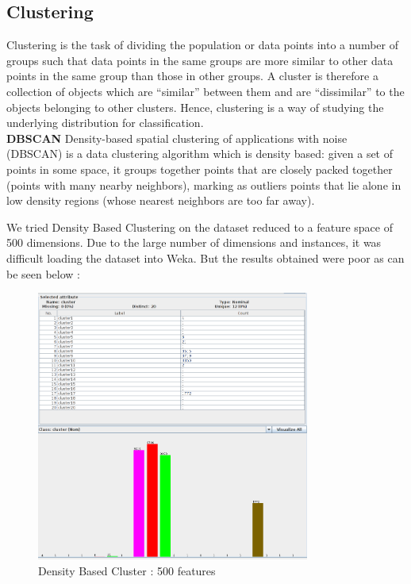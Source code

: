 \documentclass[12pt]{report}
\begin{document}
\subsection{Clustering}
Clustering is the task of dividing the population or data points into a number of groups such that data points in the same groups are more similar to other data points in the same group than those in other groups. A cluster is therefore a collection of objects which are “similar” between them and are “dissimilar” to the objects belonging to other clusters. Hence, clustering is a way of studying the underlying distribution for classification.\\

\textbf{DBSCAN}
Density-based spatial clustering of applications with noise (DBSCAN) is a data clustering algorithm which is density based: given a set of points in some space, it groups together points that are closely packed together (points with many nearby neighbors), marking as outliers points that lie alone in low density regions (whose nearest neighbors are too far away).

We tried Density Based Clustering on the dataset reduced to a feature space of 500 dimensions. Due to the large number of dimensions and instances, it was difficult loading the dataset into Weka. But the results obtained were poor as can be seen below :

\begin{figure}[H]
  \centering
  \includegraphics[width=0.8\textwidth]{Images/cluster_densitybased.png}
  \caption{Density Based Cluster : 500 features}
\end{figure}
\end{document}
